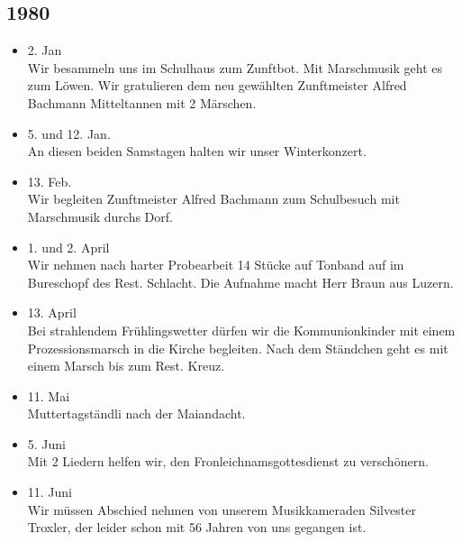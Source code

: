 \subsection{1980}

\begin{history}

    \begin{itemize}

        \item 2. Jan\\
              Wir besammeln uns im Schulhaus zum Zunftbot. Mit Marschmusik geht es zum
              Löwen. Wir gratulieren dem neu gewählten Zunftmeister Alfred Bachmann
              Mitteltannen mit 2 Märschen.

        \item 5. und 12. Jan.\\
              An diesen beiden Samstagen halten wir unser Winterkonzert.

        \item 13. Feb.\\
              Wir begleiten Zunftmeister Alfred Bachmann zum Schulbesuch mit
              Marschmusik durchs Dorf.

        \item 1. und 2. April\\
              Wir nehmen nach harter Probearbeit 14 Stücke auf Tonband auf im
              Bureschopf des Rest. Schlacht. Die Aufnahme macht Herr Braun aus Luzern.

        \item 13. April\\
              Bei strahlendem Frühlingswetter dürfen wir die Kommunionkinder mit einem
              Prozessionsmarsch in die Kirche begleiten. Nach dem Ständchen geht es
              mit einem Marsch bis zum Rest. Kreuz.

        \item 11. Mai\\
              Muttertagständli nach der Maiandacht.

        \item 5. Juni\\
              Mit 2 Liedern helfen wir, den Fronleichnamsgottesdienst zu verschönern.

        \item 11. Juni\\
              Wir müssen Abschied nehmen von unserem Musikkameraden Silvester Troxler,
              der leider schon mit 56 Jahren von uns gegangen ist.


\end{itemize}
\end{history}
